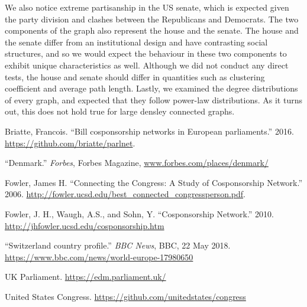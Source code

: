 \documentclass[12pt]{article}
\begin{document}
\begin{multicols*}{2}
We also notice extreme partisanship in the US senate, which is expected given the party division and clashes between the Republicans and Democrats. The two components of the graph also represent the house and the senate. The house and the senate differ from an institutional design and have contrasting social structures, and so we would expect the behaviour in these two components to exhibit unique characteristics as well. Although we did not conduct any direct tests, the house and senate should differ in quantities such as clustering coefficient and average path length. 
Lastly, we examined the degree distributions of every graph, and expected that they follow power-law distributions. As it turns out, this does not hold true for large densley connected graphs.

\begin{thebibliography}{9}

 Briatte, Francois. ``Bill cosponsorship networks in European parliaments.'' 2016. \url{https://github.com/briatte/parlnet}.

 ``Denmark.'' \emph{Forbes}, Forbes Magazine, \url{www.forbes.com/places/denmark/}

 Fowler, James H. ``Connecting the Congress: A Study of Cosponsorship Network.'' 2006. \url{http://fowler.ucsd.edu/best_connected_congressperson.pdf}.

 Fowler, J. H., Waugh, A.S., and Sohn, Y. ``Cosponsorship Network.'' 2010. \url {http://jhfowler.ucsd.edu/cosponsorship.htm}

 ``Switzerland country profile.'' \emph{BBC News}, BBC, 22 May 2018. \url{https://www.bbc.com/news/world-europe-17980650}

 UK Parliament. \url{https://edm.parliament.uk/}

 United States Congress. \url{https://github.com/unitedstates/congress}
\end{thebibliography}


\end{multicols*}
\end{document}
